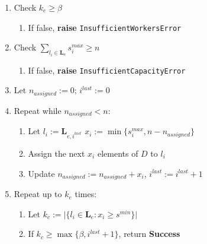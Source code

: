 \documentclass[../mthe-493-final-project.tex]{subfiles}
\begin{document}
\begin{enumerate}
\begin{enumerate}
            \end{enumerate}
        \item Check $k_e \geq \beta$
            \begin{enumerate}
                \item If false, \textbf{raise} \texttt{InsufficientWorkersError}
            \end{enumerate}
        \item Check $\sum_{l_i \in \mathbf{L}_e} s^{max}_i \geq n$
            \begin{enumerate}
                \item If false, \textbf{raise} \texttt{InsufficientCapacityError}
            \end{enumerate}
        \item Let $n_{assigned} := 0$; $i^{last} := 0$
        \item Repeat while $n_{assigned} < n$:
            \begin{enumerate}
                \item Let $l_i := \mathbf{L}_{e,i^{last}}$ $x_i := \min\{s^{max}_i, n - n_{assigned}\}$
                \item Assign the next $x_i$ elements of $D$ to $l_i$
                \item Update $n_{assigned} := n_{assigned} + x_i$, $i^{last} := i^{last} + 1$
            \end{enumerate}
        \item Repeat up to $k_e$ times:
        \begin{enumerate}
            \item Let $k_c := \vert \{l_i \in \mathbf{L}_e : x_i \geq s^{min} \} \vert$
            \item If $k_c \geq \max\{\beta, i^{last} + 1\}$, return \textbf{Success}
            
        \end{enumerate}
        
    \end{enumerate}

\end{document}
